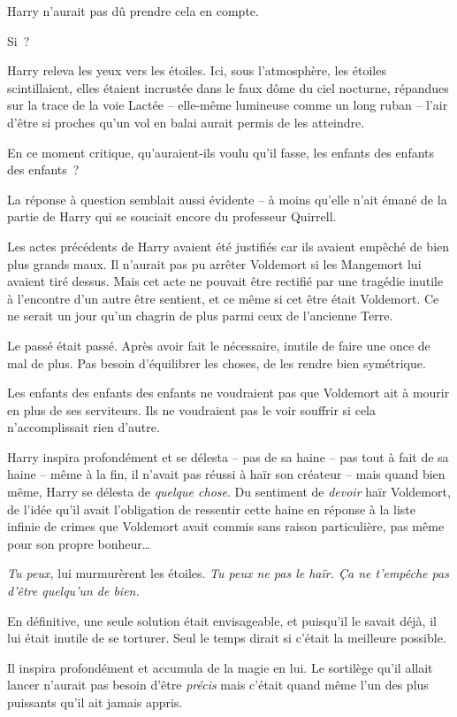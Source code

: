 Harry n'aurait pas dû prendre cela en compte.

Si~?

Harry releva les yeux vers les étoiles. Ici, sous l'atmosphère, les étoiles scintillaient, elles étaient incrustée dans le faux dôme du ciel nocturne, répandues sur la trace de la voie Lactée -- elle-même lumineuse comme un long ruban -- l'air d'être si proches qu'un vol en balai aurait permis de les atteindre.

En ce moment critique, qu'auraient-ils voulu qu'il fasse, les enfants des enfants des enfants~?

La réponse à question semblait aussi évidente -- à moins qu'elle n'ait émané de la partie de Harry qui se souciait encore du professeur Quirrell.

Les actes précédents de Harry avaient été justifiés car ils avaient empêché de bien plus grands maux. Il n'aurait pas pu arrêter Voldemort si les Mangemort lui avaient tiré dessus. Mais cet acte ne pouvait être rectifié par une tragédie inutile à l'encontre d'un autre être sentient, et ce même si cet être était Voldemort. Ce ne serait un jour qu'un chagrin de plus parmi ceux de l'ancienne Terre.

Le passé était passé. Après avoir fait le nécessaire, inutile de faire une once de mal de plus. Pas besoin d'équilibrer les choses, de les rendre bien symétrique.

Les enfants des enfants des enfants ne voudraient pas que Voldemort ait à mourir en plus de ses serviteurs. Ils ne voudraient pas le voir souffrir si cela n'accomplissait rien d'autre.

Harry inspira profondément et se délesta -- pas de sa haine -- pas tout à fait de sa haine -- même à la fin, il n'avait pas réussi à haïr son créateur -- mais quand bien même, Harry se délesta de \emph{quelque chose}. Du sentiment de \emph{devoir} haïr Voldemort, de l'idée qu'il avait l'obligation de ressentir cette haine en réponse à la liste infinie de crimes que Voldemort avait commis sans raison particulière, pas même pour son propre bonheur…

\emph{Tu peux,} lui murmurèrent les étoiles. \emph{Tu peux ne pas le haïr. Ça ne t'empêche pas d'être quelqu'un de bien.}

En définitive, une seule solution était envisageable, et puisqu'il le savait déjà, il lui était inutile de se torturer. Seul le temps dirait si c'était la meilleure possible.

Il inspira profondément et accumula de la magie en lui. Le sortilège qu'il allait lancer n'aurait pas besoin d'être \emph{précis} mais c'était quand même l'un des plus puissants qu'il ait jamais appris.

